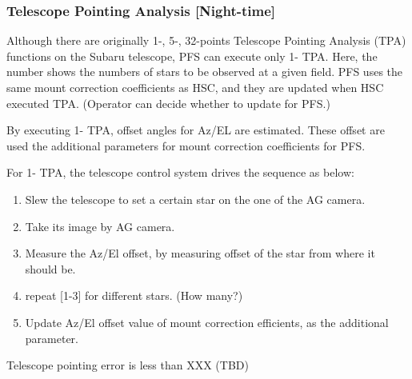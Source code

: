 \subsubsection{Telescope Pointing Analysis [Night-time]}\label{secflow:TPA1}


Although there are originally 1-, 5-, 32-points Telescope Pointing Analysis (TPA) functions on the Subaru telescope, PFS can execute only 1- TPA.
Here, the number shows the numbers of stars to be observed at a given field.
PFS uses the same mount correction coefficients as HSC, and they are updated when HSC executed TPA.
(Operator can decide whether to update for PFS.)

By executing 1- TPA, offset angles for Az/EL are estimated.
These offset are used the additional parameters for mount correction coefficients for PFS.

For 1- TPA, the telescope control system drives the sequence as below:
\begin{enumerate}
\item Slew the telescope to set a certain star on the one of the AG camera.
\item Take its image by AG camera.
\item Measure the Az/El offset, by measuring offset of the star from where it should be.
\item repeat [1-3] for different stars. (How many?)
\item Update Az/El offset value of mount correction efficients, as the additional parameter.
\end{enumerate}




\begin{itembox}[l]{}
Telescope pointing error is less than XXX (TBD)

\end{itembox}